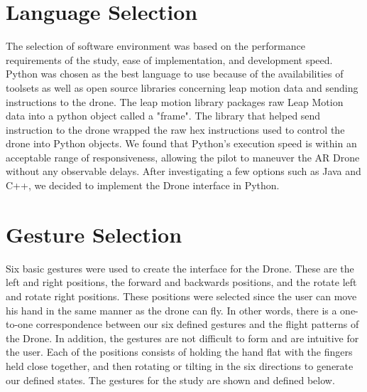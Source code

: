 \documentclass[letterpaper,english, 12pt]{article}
\begin{document}
\section*{Language Selection}

The selection of software environment was based on the performance requirements of the study, ease of implementation, and development speed. Python was chosen as the best language to use because of the availabilities of toolsets as well as open source libraries concerning leap motion data and sending instructions to the drone. The leap motion library packages raw Leap Motion data into a python object called a "frame"\cite{cit9}. The library that helped send instruction to the drone wrapped the raw hex instructions used to control the drone into Python objects. We found that Python's execution speed is within an acceptable range of responsiveness, allowing the pilot to maneuver the AR Drone without any observable delays. After investigating a few options such as Java and C++, we decided to implement the Drone interface in Python.

\section*{Gesture Selection}

Six basic gestures were used to create the interface for the Drone. These are the left and right positions, the forward and backwards positions, and the rotate left and rotate right positions. These positions were selected since the user can move his hand in the same manner as the drone can fly. In other words, there is a one-to-one correspondence between our six defined gestures and the flight patterns of the Drone. In addition, the gestures are not difficult to form and are intuitive for the user.  Each of the positions consists of holding the hand flat with the fingers held close together, and then rotating or tilting in the six directions to generate our defined states. The gestures for the study are shown and defined below.
\end{document}
